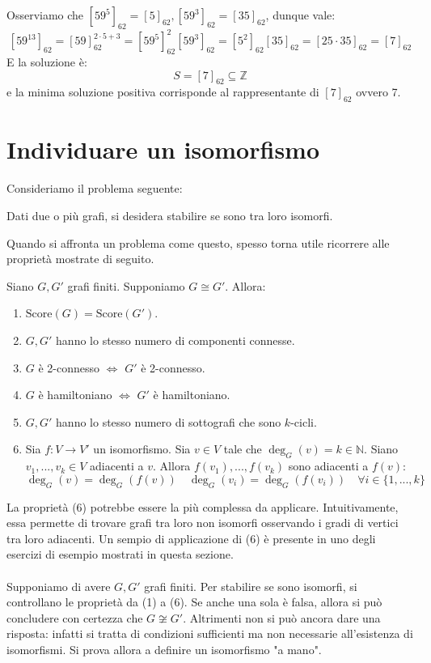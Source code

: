 \documentclass[oneside]{book}
\begin{document}
\begin{tcolorbox}[enhanced, breakable, colback=blue!30, colframe=blue!30!black, title=Esempio]
Osserviamo che $[59^5]_{62}=[5]_{62}, [59^3]_{62}=[35]_{62}$, dunque
vale:
\[ [59^{13}]_{62}=[59]^{2\cdot5+3}_{62}=[59^5]^2_{62}[59^3]_{62}=[5^2]_{62}[35]_{62}=[25\cdot35]_{62}=[7]_{62} \]
E la soluzione è:
\[ S=[7]_{62}\subseteq\mathbb{Z} \]
e la minima soluzione positiva corrisponde al rappresentante di $[7]_{62}$
ovvero 7.
\end{tcolorbox}










\section{Individuare un isomorfismo}
Consideriamo il problema seguente:
\begin{center}
Dati due o più grafi, si desidera stabilire se sono tra loro isomorfi.
\end{center}
Quando si affronta un problema come questo, spesso torna utile ricorrere
alle proprietà mostrate di seguito.
\begin{tcolorbox}[colback=red!30, colframe=red!30!black, title=Alcune caratteristiche dei grafi isomorfi]
Siano $G,G'$ grafi finiti. Supponiamo $G\cong G'$. Allora:
\begin{enumerate}
\item $\text{Score}(G)=\text{Score}(G')$.
\item $G,G'$ hanno lo stesso numero di componenti connesse.
\item $G$ è 2-connesso $\Longleftrightarrow$ $G'$ è 2-connesso.
\item $G$ è hamiltoniano $\Longleftrightarrow$ $G'$ è hamiltoniano.
\item $G,G'$ hanno lo stesso numero di sottografi che sono $k$-cicli.
\item Sia $f:V\to V'$ un isomorfismo. Sia $v\in V$ tale che $\deg_G(v)=k\in\mathbb{N}$.
Siano $v_1,...,v_k \in V$ adiacenti a $v$. Allora $f(v_1),...,f(v_k)$ sono
adiacenti a $f(v)$: \[\deg_G(v)=\deg_G(f(v)) \quad \deg_G(v_i)=\deg_G(f(v_i)) \quad \forall i \in\{1,...,k\}\]
\end{enumerate}
\end{tcolorbox}

La proprietà (6) potrebbe essere la più complessa da applicare. Intuitivamente,
essa permette di trovare grafi tra loro non isomorfi osservando i gradi
di vertici tra loro adiacenti. Un sempio di applicazione di (6) è presente
in uno degli esercizi di esempio mostrati in questa sezione.
\\\\
Supponiamo di avere $G,G'$ grafi finiti. Per stabilire se sono isomorfi, si
controllano le proprietà da (1) a (6). Se anche una sola è falsa, allora
si può concludere con certezza che $G\not\cong G'$. Altrimenti non si può
ancora dare una risposta: infatti si tratta di condizioni sufficienti ma
non necessarie all'esistenza di isomorfismi. Si prova allora a definire un
isomorfismo "a mano".
\end{document}
